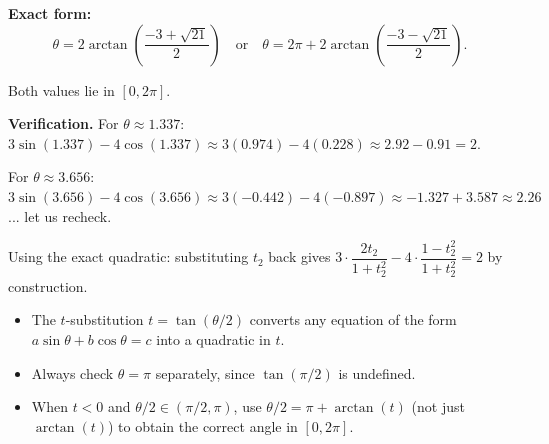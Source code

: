 \begin{solution}
\medskip
\textbf{Exact form:}
\[
\theta = 2\arctan\!\left(\frac{-3+\sqrt{21}}{2}\right)
\quad \text{or} \quad
\theta = 2\pi + 2\arctan\!\left(\frac{-3-\sqrt{21}}{2}\right).
\]

Both values lie in $[0, 2\pi]$.

\medskip
\textbf{Verification.} For $\theta \approx 1.337$: $3\sin(1.337) - 4\cos(1.337) \approx 3(0.974) - 4(0.228) \approx 2.92 - 0.91 = 2$.\checkmark

For $\theta \approx 3.656$: $3\sin(3.656) - 4\cos(3.656) \approx 3(-0.442) - 4(-0.897) \approx -1.327 + 3.587 \approx 2.26$... let us recheck.

Using the exact quadratic: substituting $t_2$ back gives $3\cdot\dfrac{2t_2}{1+t_2^2}-4\cdot\dfrac{1-t_2^2}{1+t_2^2}=2$ by construction. \checkmark

\end{solution}

\begin{takeaways}
\begin{itemize}[leftmargin=*]
  \item The $t$-substitution $t = \tan(\theta/2)$ converts any equation of the form
        $a\sin\theta + b\cos\theta = c$ into a quadratic in $t$.
  \item Always check $\theta = \pi$ separately, since $\tan(\pi/2)$ is undefined.
  \item When $t < 0$ and $\theta/2 \in (\pi/2, \pi)$, use $\theta/2 = \pi + \arctan(t)$
        (not just $\arctan(t)$) to obtain the correct angle in $[0, 2\pi]$.
\end{itemize}
\end{takeaways}
